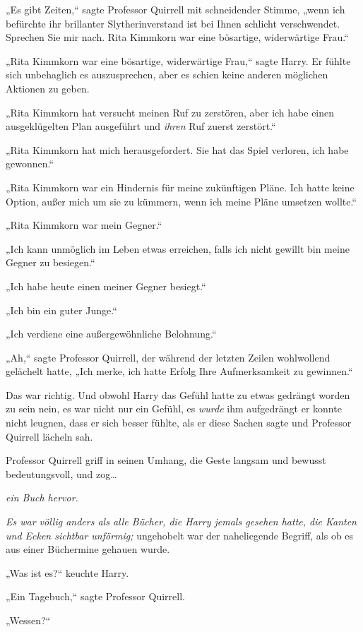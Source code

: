 {„Es gibt Zeiten,“ sagte Professor Quirrell mit schneidender Stimme, „wenn ich befürchte ihr brillanter Slytherinverstand ist bei Ihnen schlicht verschwendet. Sprechen Sie mir nach. Rita Kimmkorn war eine bösartige, widerwärtige Frau.“

„Rita Kimmkorn war eine bösartige, widerwärtige Frau,“ sagte Harry. Er fühlte sich unbehaglich es auszusprechen, aber es schien keine anderen möglichen Aktionen zu geben.

„Rita Kimmkorn hat versucht meinen Ruf zu zerstören, aber ich habe einen ausgeklügelten Plan ausgeführt und \emph{ihren} Ruf zuerst zerstört.“

„Rita Kimmkorn hat mich herausgefordert. Sie hat das Spiel verloren, ich habe gewonnen.“

„Rita Kimmkorn war ein Hindernis für meine zukünftigen Pläne. Ich hatte keine Option, außer mich um sie zu kümmern, wenn ich meine Pläne umsetzen wollte.“

„Rita Kimmkorn war mein Gegner.“

„Ich kann unmöglich im Leben etwas erreichen, falls ich nicht gewillt bin meine Gegner zu besiegen.“

„Ich habe heute einen meiner Gegner besiegt.“

„Ich bin ein guter Junge.“

„Ich verdiene eine außergewöhnliche Belohnung.“

„Ah,“ sagte Professor Quirrell, der während der letzten Zeilen wohlwollend gelächelt hatte, „Ich merke, ich hatte Erfolg Ihre Aufmerksamkeit zu gewinnen.“

Das war richtig. Und obwohl Harry das Gefühl hatte zu etwas gedrängt worden zu sein \later nein, es war nicht nur ein Gefühl, es \emph{wurde} ihm aufgedrängt \later er konnte nicht leugnen, dass er sich besser fühlte, als er diese Sachen sagte und Professor Quirrell lächeln sah.

Professor Quirrell griff in seinen Umhang, die Geste langsam und bewusst bedeutungsvoll, und zog…

\emph{ein Buch hervor.}

\emph{Es war völlig anders als alle Bücher, die Harry jemals gesehen hatte, die Kanten und Ecken sichtbar unförmig;} ungehobelt war der naheliegende Begriff, als ob es aus einer Büchermine gehauen wurde.

„Was ist es?“ keuchte Harry.

„Ein Tagebuch,“ sagte Professor Quirrell.

„Wessen?“

}
